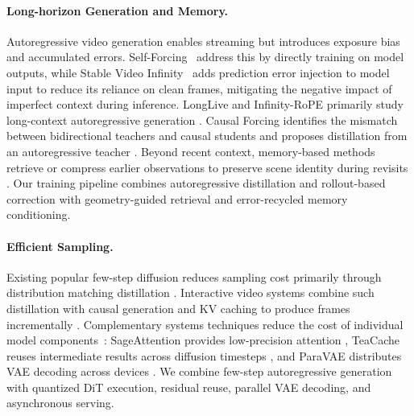 \paragraph{\bf{Long-horizon Generation and Memory.}}
Autoregressive video generation enables streaming but introduces exposure bias
and accumulated errors. Self-Forcing~\citep{huang2025selfforcing} address this by directly training on model outputs, while Stable Video Infinity~\citep{li2025stablevideoinfinity} adds prediction error injection to model input to reduce its reliance on clean frames, mitigating the negative impact of imperfect context during inference. LongLive and Infinity-RoPE primarily study long-context autoregressive generation
\citep{yang2025longlive,yesiltepe2025infinityrope}. Causal Forcing identifies
the mismatch between bidirectional teachers and causal students and proposes distillation from an autoregressive teacher
\citep{zhu2026causalforcing,zhao2026causalforcingplusplus}.
Beyond recent context, memory-based methods retrieve or compress earlier
observations to preserve scene identity during revisits
\citep{yu2025contextmemory,sun2025worldplay,hong2025relic,
yu2026mosaicmem,wang2026matrixgame}. Our training pipeline combines
autoregressive distillation and rollout-based correction with geometry-guided
retrieval and error-recycled memory conditioning.

\paragraph{\bf{Efficient Sampling.}}
Existing popular few-step diffusion reduces sampling cost primarily through distribution matching
distillation \citep{yin2024onestep,yin2024improved}. Interactive video systems
combine such distillation with causal generation and KV caching to produce
frames incrementally
\citep{huang2025selfforcing,yang2025longlive,zhu2026causalforcing}.
Complementary systems techniques reduce the cost of individual model
components~\citep{zhang2025sageattention, wang2026fasa, liu2025teacache, riseai2026paravae}: SageAttention provides low-precision attention
\citep{zhang2025sageattention}, TeaCache reuses intermediate results across
diffusion timesteps \citep{liu2025teacache}, and ParaVAE distributes VAE
decoding across devices \citep{riseai2026paravae}. We combine few-step
autoregressive generation with quantized DiT execution, residual reuse,
parallel VAE decoding, and asynchronous serving.

